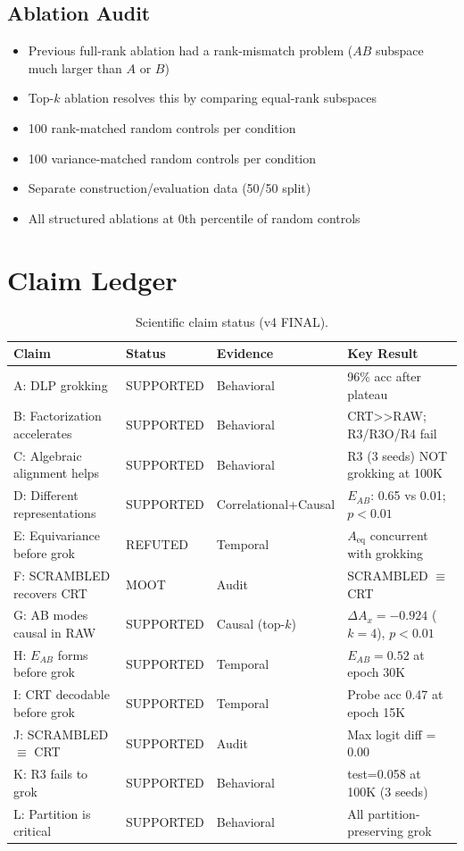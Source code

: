 \documentclass[11pt,a4paper]{article}
\newcommand{\EAB}{E_{AB}}
\newcommand{\Aeq}{A_{\mathrm{eq}}}
\begin{document}
\subsection{Ablation Audit}

\begin{itemize}
\item Previous full-rank ablation had a rank-mismatch problem ($AB$ subspace much larger than $A$ or $B$)
\item Top-$k$ ablation resolves this by comparing equal-rank subspaces
\item 100 rank-matched random controls per condition
\item 100 variance-matched random controls per condition
\item Separate construction/evaluation data (50/50 split)
\item All structured ablations at 0th percentile of random controls
\end{itemize}

\section{Claim Ledger}

\begin{table}[h]
\centering
\caption{Scientific claim status (v4 FINAL).}
\begin{tabular}{llll}
\toprule
Claim & Status & Evidence & Key Result \\
\midrule
A: DLP grokking & SUPPORTED & Behavioral & 96\% acc after plateau \\
B: Factorization accelerates & SUPPORTED & Behavioral & CRT>>RAW; R3/R3O/R4 fail \\
C: Algebraic alignment helps & SUPPORTED & Behavioral & R3 (3 seeds) NOT grokking at 100K \\
D: Different representations & SUPPORTED & Correlational+Causal & $\EAB$: 0.65 vs 0.01; $p<0.01$ \\
E: Equivariance before grok & REFUTED & Temporal & $\Aeq$ concurrent with grokking \\
F: SCRAMBLED recovers CRT & MOOT & Audit & SCRAMBLED $\equiv$ CRT \\
G: AB modes causal in RAW & SUPPORTED & Causal (top-$k$) & $\Delta A_x=-0.924$ ($k=4$), $p<0.01$ \\
H: $\EAB$ forms before grok & SUPPORTED & Temporal & $\EAB=0.52$ at epoch 30K \\
I: CRT decodable before grok & SUPPORTED & Temporal & Probe acc 0.47 at epoch 15K \\
J: SCRAMBLED $\equiv$ CRT & SUPPORTED & Audit & Max logit diff = 0.00 \\
K: R3 fails to grok & SUPPORTED & Behavioral & test=0.058 at 100K (3 seeds) \\
L: Partition is critical & SUPPORTED & Behavioral & All partition-preserving grok \\
\bottomrule
\end{tabular}
\end{table}
\end{document}
